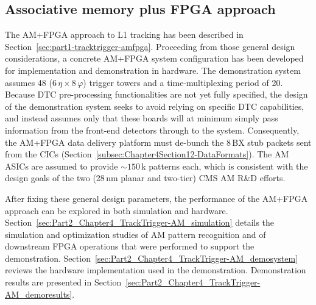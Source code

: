 \subsection{Associative memory plus FPGA approach} 
\label{sec:Part2_Chapter4_TrackTrigger-AM}
The AM+FPGA approach to L1 tracking has been described in Section~\ref{sec:part1-tracktrigger-amfpga}. Proceeding from those general design considerations, a concrete AM+FPGA system configuration has been developed for implementation and demonstration in hardware. The demonstration system assumes 48 ($6\,\eta \times 8\,\varphi$) trigger towers and a time-multiplexing period of 20. Because DTC pre-processing functionalities are not yet fully specified, the design of the demonstration system seeks to avoid relying on specific DTC capabilities, and instead assumes only that these boards will at minimum simply pass information from the front-end detectors through to the \TF system. Consequently, the AM+FPGA data delivery platform must de-bunch the 8\,BX stub packets sent from the CICs (Section~\ref{subsec:Chapter4Section12-DataFormats}). The AM ASICs are assumed to provide $\sim 150$\,k patterns each, which is consistent with the design goals of the two (28\,nm planar and two-tier) CMS AM R\&D efforts.

After fixing these general design parameters, the performance of the AM+FPGA approach can be explored in both simulation and hardware. Section~\ref{sec:Part2_Chapter4_TrackTrigger-AM_simulation} details the simulation and optimization studies of AM pattern recognition and of downstream FPGA operations that were performed to support the demonstration.  Section~\ref{sec:Part2_Chapter4_TrackTrigger-AM_demosystem} reviews the hardware implementation used in the demonstration. Demonstration results are presented in Section~\ref{sec:Part2_Chapter4_TrackTrigger-AM_demoresults}.

